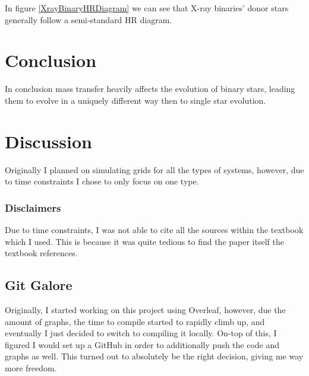 \documentclass[12pt, a4paper]{article}
\begin{document}
        In figure \ref{XrayBinaryHRDiagram} we can see that X-ray binaries' donor stars generally follow a semi-standard HR diagram. 



\section{\centering Conclusion}
    In conclusion mass transfer heavily affects the evolution of binary stars, leading them to evolve in a uniquely different way then to single star evolution. 

\section{\centering Discussion}   
    Originally I planned on simulating grids for all the types of systems, however, due to time constraints I chose to only focus on one type. 

    \subsubsection{Disclaimers}
        Due to time constraints, I was not able to cite all the sources within the textbook \parencite{TaurisvandenHeuvel+2023} which I used. This is because it was quite tedious to find the paper itself the textbook references. 

    \subsection{Git Galore}
    Originally, I started working on this project using Overleaf, however, due the amount of graphs, the time to compile started to rapidly climb up, and eventually I just decided to switch to compiling it locally. On-top of this, I figured I would set up a GitHub in order to additionally push the code and graphs as well. This turned out to absolutely be the right decision, giving me way more freedom.
    
\printbibliography[
heading=bibintoc,
title={\centering Sources}
]
\end{document}
